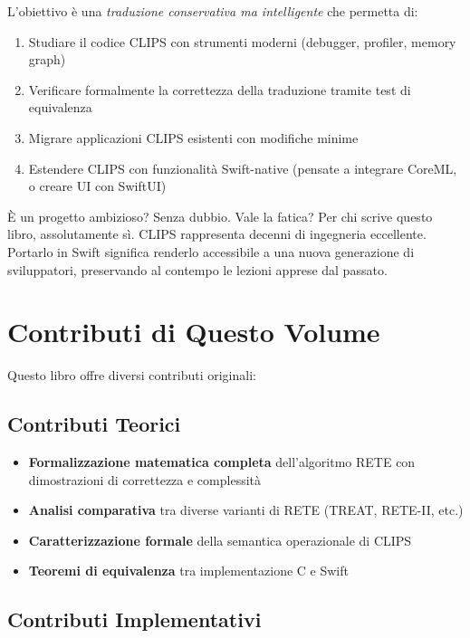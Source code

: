 L'obiettivo è una \textit{traduzione conservativa ma intelligente} che permetta di:
\begin{enumerate}
\item Studiare il codice CLIPS con strumenti moderni (debugger, profiler, memory graph)
\item Verificare formalmente la correttezza della traduzione tramite test di equivalenza
\item Migrare applicazioni CLIPS esistenti con modifiche minime
\item Estendere CLIPS con funzionalità Swift-native (pensate a integrare CoreML, o creare UI con SwiftUI)
\end{enumerate}

È un progetto ambizioso? Senza dubbio. Vale la fatica? Per chi scrive questo libro, assolutamente sì. CLIPS rappresenta decenni di ingegneria eccellente. Portarlo in Swift significa renderlo accessibile a una nuova generazione di sviluppatori, preservando al contempo le lezioni apprese dal passato.

\section{Contributi di Questo Volume}

Questo libro offre diversi contributi originali:

\subsection{Contributi Teorici}

\begin{itemize}
\item \textbf{Formalizzazione matematica completa} dell'algoritmo RETE con dimostrazioni di correttezza e complessità
\item \textbf{Analisi comparativa} tra diverse varianti di RETE (TREAT, RETE-II, etc.)
\item \textbf{Caratterizzazione formale} della semantica operazionale di CLIPS
\item \textbf{Teoremi di equivalenza} tra implementazione C e Swift
\end{itemize}

\subsection{Contributi Implementativi}

